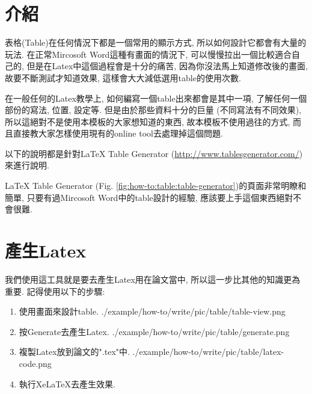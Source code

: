 \section{介紹}

表格(Table)在任何情況下都是一個常用的顯示方式, 所以如何設計它都會有大量的玩法. 在正常Mircosoft Word這種有畫面的情況下, 可以慢慢拉出一個比較適合自己的, 但是在Latex中這個過程會是十分的痛苦, 因為你沒法馬上知道修改後的畫面, 故要不斷測試才知道效果, 這樣會大大減低選用table的使用次數.

在一般任何的Latex教學上, 如何編寫一個table出來都會是其中一項, 了解任何一個部份的寫法, 位置, 設定等. 但是由於那些資料十分的巨量 (不同寫法有不同效果), 所以這絕對不是使用本模板的大家想知道的東西, 故本模板不使用過往的方式, 而且直接教大家怎樣使用現有的online tool去處理掉這個問題.

以下的說明都是針對LaTeX Table Generator (\url{http://www.tablesgenerator.com/})\cite{web:latex:table-generator}來進行說明.

LaTeX Table Generator (Fig. \ref{fig:how-to:table:table-generator})的頁面非常明瞭和簡單, 只要有過Mircosoft Word中的table設計的經驗, 應該要上手這個東西絕對不會很難.

\newpage
{}

\newpage
\section{產生Latex}

  我們使用這工具就是要去產生Latex用在論文當中, 所以這一步比其他的知識更為重要. 記得使用以下的步驟:

  \begin{enumerate}
    \item
    {
      使用畫面來設計table.
      \InsertCenterImage
        {./example/how-to/write/pic/table/table-view.png}
    } %

    \item
    {
      按Generate去產生Latex.
      \InsertCenterImage
        {./example/how-to/write/pic/table/generate.png}
    } %

    \item
    {
      複製Latex放到論文的".tex"中.
      \InsertCenterImage
        {./example/how-to/write/pic/table/latex-code.png}
    } %

    \item
    {
      執行XeLaTeX去產生效果.
    } %
  \end{enumerate}

